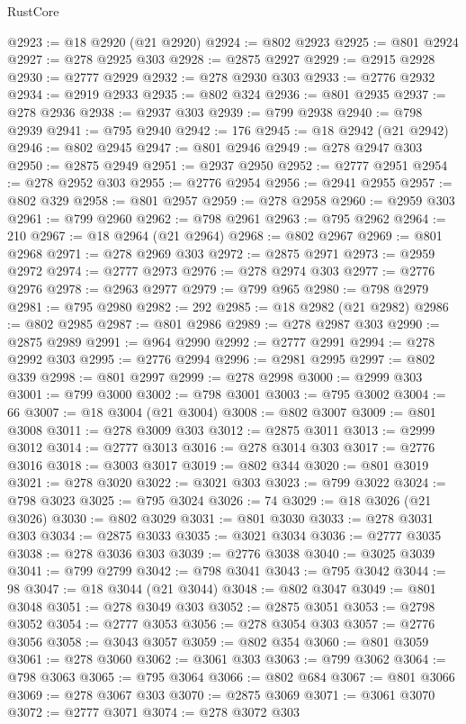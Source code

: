 \begin{lexlean}{RustCore}
\begin{coremodule}
@2923 := @18 @2920 (@21 @2920)
@2924 := @802 @2923
@2925 := @801 @2924
@2927 := @278 @2925 @303
@2928 := @2875 @2927
@2929 := @2915 @2928
@2930 := @2777 @2929
@2932 := @278 @2930 @303
@2933 := @2776 @2932
@2934 := @2919 @2933
@2935 := @802 @324
@2936 := @801 @2935
@2937 := @278 @2936
@2938 := @2937 @303
@2939 := @799 @2938
@2940 := @798 @2939
@2941 := @795 @2940
@2942 := 176
@2945 := @18 @2942 (@21 @2942)
@2946 := @802 @2945
@2947 := @801 @2946
@2949 := @278 @2947 @303
@2950 := @2875 @2949
@2951 := @2937 @2950
@2952 := @2777 @2951
@2954 := @278 @2952 @303
@2955 := @2776 @2954
@2956 := @2941 @2955
@2957 := @802 @329
@2958 := @801 @2957
@2959 := @278 @2958
@2960 := @2959 @303
@2961 := @799 @2960
@2962 := @798 @2961
@2963 := @795 @2962
@2964 := 210
@2967 := @18 @2964 (@21 @2964)
@2968 := @802 @2967
@2969 := @801 @2968
@2971 := @278 @2969 @303
@2972 := @2875 @2971
@2973 := @2959 @2972
@2974 := @2777 @2973
@2976 := @278 @2974 @303
@2977 := @2776 @2976
@2978 := @2963 @2977
@2979 := @799 @965
@2980 := @798 @2979
@2981 := @795 @2980
@2982 := 292
@2985 := @18 @2982 (@21 @2982)
@2986 := @802 @2985
@2987 := @801 @2986
@2989 := @278 @2987 @303
@2990 := @2875 @2989
@2991 := @964 @2990
@2992 := @2777 @2991
@2994 := @278 @2992 @303
@2995 := @2776 @2994
@2996 := @2981 @2995
@2997 := @802 @339
@2998 := @801 @2997
@2999 := @278 @2998
@3000 := @2999 @303
@3001 := @799 @3000
@3002 := @798 @3001
@3003 := @795 @3002
@3004 := 66
@3007 := @18 @3004 (@21 @3004)
@3008 := @802 @3007
@3009 := @801 @3008
@3011 := @278 @3009 @303
@3012 := @2875 @3011
@3013 := @2999 @3012
@3014 := @2777 @3013
@3016 := @278 @3014 @303
@3017 := @2776 @3016
@3018 := @3003 @3017
@3019 := @802 @344
@3020 := @801 @3019
@3021 := @278 @3020
@3022 := @3021 @303
@3023 := @799 @3022
@3024 := @798 @3023
@3025 := @795 @3024
@3026 := 74
@3029 := @18 @3026 (@21 @3026)
@3030 := @802 @3029
@3031 := @801 @3030
@3033 := @278 @3031 @303
@3034 := @2875 @3033
@3035 := @3021 @3034
@3036 := @2777 @3035
@3038 := @278 @3036 @303
@3039 := @2776 @3038
@3040 := @3025 @3039
@3041 := @799 @2799
@3042 := @798 @3041
@3043 := @795 @3042
@3044 := 98
@3047 := @18 @3044 (@21 @3044)
@3048 := @802 @3047
@3049 := @801 @3048
@3051 := @278 @3049 @303
@3052 := @2875 @3051
@3053 := @2798 @3052
@3054 := @2777 @3053
@3056 := @278 @3054 @303
@3057 := @2776 @3056
@3058 := @3043 @3057
@3059 := @802 @354
@3060 := @801 @3059
@3061 := @278 @3060
@3062 := @3061 @303
@3063 := @799 @3062
@3064 := @798 @3063
@3065 := @795 @3064
@3066 := @802 @684
@3067 := @801 @3066
@3069 := @278 @3067 @303
@3070 := @2875 @3069
@3071 := @3061 @3070
@3072 := @2777 @3071
@3074 := @278 @3072 @303

\end{coremodule}
\end{lexlean}
